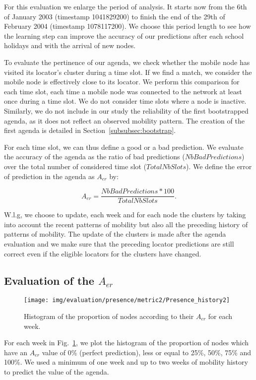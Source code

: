 \documentclass[a4paper]{sig-alternate-10pt}
\begin{document}
For this evaluation we enlarge the period of analysis. It starts now
from the 6th of January 2003 (timestamp 1041829200) to finish the
end of the 29th of February 2004 (timestamp 1078117200). We choose
this period length to see how the learning step can improve the
accuracy of our predictions after each school holidays and with the
arrival of new nodes.

To evaluate the pertinence of our agenda, we check whether the
mobile node has visited its locator's cluster during a time slot.
If we find a match, we consider the mobile node is effectively
close to its locator. We perform this comparison for each time
slot, each time a mobile node was connected to the network at least
once during a time slot. We do not consider time slots where a node
is inactive. Similarly, we do not include in our study the
reliability of the first bootstrapped agenda, as it does not
reflect an observed mobility pattern. The creation of the first
agenda is detailed in Section~\ref{subsubsec:bootstrap}.

For each time slot, we can thus define a good or a bad prediction.
We  evaluate the accuracy of the agenda as the ratio of bad
predictions ($NbBadPredictions$) over the total number of
considered time slot  ($TotalNbSlots$). We define the error of
prediction in the agenda as $A_{er}$ by:

\[
A_{er} = \frac{NbBadPredictions * 100}{TotalNbSlots}.
\]

W.l.g, we choose to update, each week and for each node the 
clusters by taking into account the recent patterns of mobility
but also all the preceding history of patterns of mobility. The 
update of the clusters is made after the agenda evaluation and 
we make sure that the preceding locator predictions are still 
correct even if the eligible locators for the clusters have changed.

\subsection{Evaluation of the $A_{er}$}
\begin{figure}
\texttt{[image: img/evaluation/presence/metric2/Presence\_history2]}
\caption{Histogram of the proportion of nodes according to their
$A_{er}$ for each week.} \label{fig:presence}
\end{figure}

For each week in Fig.~\ref{fig:presence}, we plot the histogram 
of the proportion of nodes which have an $A_{er}$ value of
0\% (perfect prediction), less or equal to 25\%, 50\%, 75\% and
100\%.  We used a minimum of one week and up to two weeks of
mobility history to predict the value of the agenda.
\end{document}
